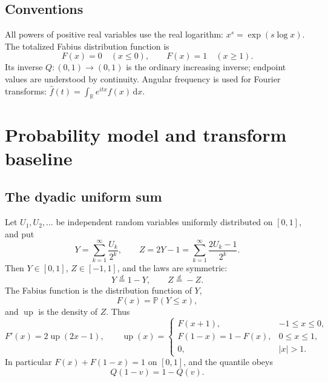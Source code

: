 \documentclass[11pt,oneside]{article}
\theoremstyle{definition}
\newcommand{\F}{F}
\newcommand{\Q}{Q}
\newcommand{\upf}{\operatorname{up}}
\newcommand{\Prob}{\mathbb P}
\newcommand{\R}{\mathbb R}
\newcommand{\dd}{\,\mathrm d}
\begin{document}
\subsection{Conventions}

All powers of positive real variables use the real logarithm:
\(x^s=\exp(s\log x)\).  The totalized Fabius distribution function is
\[
 \F(x)=0\quad(x\le0),\qquad \F(x)=1\quad(x\ge1).
\]
Its inverse \(\Q:(0,1)\to(0,1)\) is the ordinary increasing inverse; endpoint values
are understood by continuity.  Angular frequency is used for Fourier transforms:
\(\widehat f(t)=\int_\R e^{itx}f(x)\dd x\).

\section{Probability model and transform baseline}

\subsection{The dyadic uniform sum}

Let \(U_1,U_2,\ldots\) be independent random variables uniformly distributed on
\([0,1]\), and put
\begin{equation}\label{eq:Ydef}
 Y=\sum_{k=1}^{\infty}\frac{U_k}{2^k},
 \qquad
 Z=2Y-1=\sum_{k=1}^{\infty}\frac{2U_k-1}{2^k}.
\end{equation}
Then \(Y\in[0,1]\), \(Z\in[-1,1]\), and the laws are symmetric:
\begin{equation}\label{eq:symmetry-laws}
 Y\overset d=1-Y,
 \qquad Z\overset d=-Z.
\end{equation}
The Fabius function is the distribution function of \(Y\),
\begin{equation}\label{eq:Fdist}
 \F(x)=\Prob(Y\le x),
\end{equation}
and \(\upf\) is the density of \(Z\).  Thus
\begin{equation}\label{eq:F-up-relations}
 \F'(x)=2\upf(2x-1),\qquad
 \upf(x)=
 \begin{cases}
   \F(x+1),&-1\le x\le0,\\
   \F(1-x)=1-\F(x),&0\le x\le1,\\
   0,&|x|>1.
 \end{cases}
\end{equation}
In particular \(\F(x)+\F(1-x)=1\) on \([0,1]\), and the quantile obeys
\begin{equation}\label{eq:Qsymmetry}
 \Q(1-v)=1-\Q(v).
\end{equation}
\end{document}
